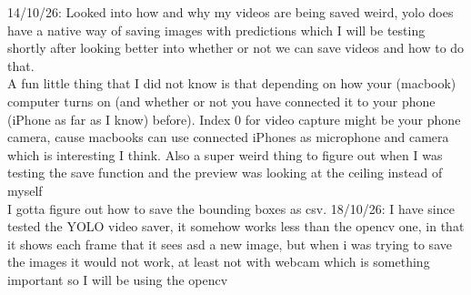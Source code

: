 \documentclass[12pt]{article}
\begin{document}
14/10/26: Looked into how and why my videos are being saved weird, yolo does have a native way of saving images with predictions which I will be testing shortly after looking better into whether or not we can save videos and how to do that.\\ 
A fun little thing that I did not know is that depending on how your (macbook) computer turns on (and whether or not you have connected it to your phone (iPhone as far as I know) before). Index 0 for video capture might be your phone camera, cause macbooks can use connected iPhones as microphone and camera which is interesting I think. Also a super weird thing to figure out when I was testing the save function and the preview was looking at the ceiling instead of myself\\
I gotta figure out how to save the bounding boxes as csv.
18/10/26: I have since tested the YOLO video saver, it somehow works less than the opencv one, in that it shows each frame that it sees asd a new image, but when i was trying to save the images it would not work, at least not with webcam which is something important  so I will be using the opencv
\end{document}
